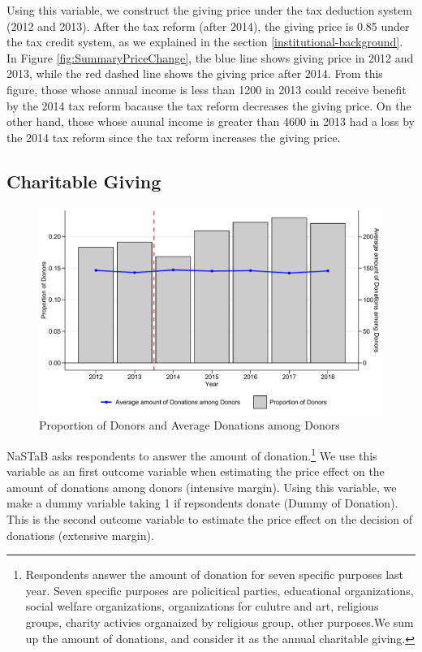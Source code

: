 \documentclass[
  11pt,
  a4paper,
]{article}
\begin{document}
  Using this variable, we construct the giving price under the tax deduction system (2012 and 2013).
  After the tax reform (after 2014), the giving price is 0.85 under the tax credit system,
  as we explained in the section \ref{institutional-background}.
  In Figure \ref{fig:SummaryPriceChange},
  the blue line shows giving price in 2012 and 2013,
  while the red dashed line shows the giving price after 2014.
  From this figure,
  those whose annual income is less than 1200 in 2013 could receive benefit by the 2014 tax reform
  bacause the tax reform decreases the giving price.
  On the other hand,
  those whose auunal income is greater than 4600 in 2013 had a loss by the 2014 tax reform
  since the tax reform increases the giving price.

  \hypertarget{charitable-giving}{%
  \subsection{Charitable Giving}\label{charitable-giving}}

  \begin{figure}[t]

  {\centering \includegraphics[width=0.9\linewidth]{draft_files/figure-latex/SummaryOutcome-1} 

  }

  \caption{Proportion of Donors and Average Donations among Donors}\label{fig:SummaryOutcome}
  \end{figure}

  NaSTaB asks respondents to answer the amount of donation.\footnote{Respondents answer the amount of donation for seven specific purposes last year. Seven specific purposes are policitical parties, educational organizations, social welfare organizations, organizations for culutre and art, religious groups, charity activies organaized by religious group, other purposes.We sum up the amount of donations, and consider it as the annual charitable giving.}
  We use this variable as an first outcome variable when
  estimating the price effect on the amount of donations among donors (intensive margin).
  Using this variable, we make a dummy variable taking 1 if repsondents donate (Dummy of Donation).
  This is the second outcome variable
  to estimate the price effect on the decision of donations (extensive margin).
\end{document}
